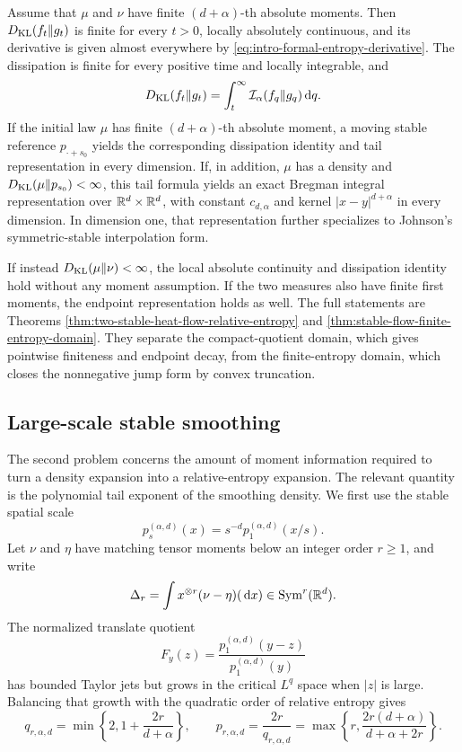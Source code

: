 \begin{unnumberedtheorem}
Assume that \(\mu\) and \(\nu\) have finite \((d+\alpha)\)-th absolute
moments.  Then \(D_{\rm KL}(f_t\|g_t)\) is finite for every \(t>0\), locally
absolutely continuous, and its derivative is given almost everywhere by
\eqref{eq:intro-formal-entropy-derivative}.  The dissipation is finite for
every positive time and locally integrable, and
\[
 D_{\rm KL}(f_t\|g_t)=\int_t^\infty \mathcal I_\alpha(f_q\|g_q)\,\mathrm{d} q.
\]
If the initial law \(\mu\) has finite \((d+\alpha)\)-th absolute moment, a
moving stable reference \(p_{\mathord\cdot+s_0}\) yields the corresponding
dissipation identity and tail representation in every dimension.  If, in
addition, \(\mu\) has a density and \(D_{\rm KL}(\mu\|p_{s_0})<\infty\), this
tail formula yields an exact Bregman integral representation over
\(\mathbb{R}^d\times\mathbb{R}^d\), with constant \(c_{d,\alpha}\) and kernel
\(\lvert x-y\rvert^{d+\alpha}\) in every dimension.  In dimension one, that
representation further specializes to Johnson's
symmetric-stable interpolation form.
\end{unnumberedtheorem}

If instead \(D_{\rm KL}(\mu\|\nu)<\infty\), the local absolute continuity and
dissipation identity hold without any moment assumption.  If the two measures
also have finite first moments, the endpoint representation holds as well.
The full statements are Theorems
\ref{thm:two-stable-heat-flow-relative-entropy} and
\ref{thm:stable-flow-finite-entropy-domain}.  They separate the
compact-quotient domain, which gives pointwise finiteness and endpoint decay,
from the finite-entropy domain, which closes the nonnegative jump form by
convex truncation.

\newpage
\subsection*{Large-scale stable smoothing}

The second problem concerns the amount of moment information required to
turn a density expansion into a relative-entropy expansion.  The relevant
quantity is the polynomial tail exponent of the smoothing density.  We first
use the stable spatial scale
\[
 p_s^{(\alpha,d)}(x)=s^{-d}p_1^{(\alpha,d)}(x/s).
\]
Let \(\nu\) and \(\eta\) have matching tensor moments below an integer order
\(r\ge1\), and write
\[
 \Delta_r=\int x^{\otimes r}(\nu-\eta)(\,\mathrm{d} x)
 \in\operatorname{Sym}^r(\mathbb{R}^d).
\]
The normalized translate quotient
\[
 F_y(z)=\frac{p_1^{(\alpha,d)}(y-z)}{p_1^{(\alpha,d)}(y)}
\]
has bounded Taylor jets but grows in the critical \(L^q\) space when
\(|z|\) is large.  Balancing that growth with the quadratic order of relative
entropy gives
\begin{equation}\label{eq:intro-critical-moment-exponent}
 q_{r,\alpha,d}=\min\left\{2,1+\frac{2r}{d+\alpha}\right\},
 \qquad
 p_{r,\alpha,d}=\frac{2r}{q_{r,\alpha,d}}
 =\max\left\{r,\frac{2r(d+\alpha)}{d+\alpha+2r}\right\}.
\end{equation}

